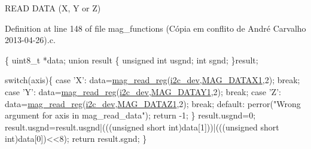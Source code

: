 R\-E\-A\-D D\-A\-T\-A (X, Y or Z) 



Definition at line 148 of file mag\-\_\-functions (\-Cópia em conflito de André Carvalho 2013-\/04-\/26).\-c.


\begin{DoxyCode}
\{
  uint8\_t *data;
  \textcolor{keyword}{union }result
  \{
    \textcolor{keywordtype}{unsigned} \textcolor{keywordtype}{int} usgnd;
    \textcolor{keywordtype}{int} sgnd;
  \}result;

  \textcolor{keywordflow}{switch}(axis)\{
    \textcolor{keywordflow}{case} \textcolor{charliteral}{'X'}:
      data=\hyperlink{imu__functions_01_07C_xC3_xB3pia_01em_01conflito_01de_01Andr_xC3_xA9_01Carvalho_012013-04-26_08_8h_a6830eaeae2298320e1e8c902e4edd709}{mag\_read\_reg}(\hyperlink{CommunicationV0_2communication_8c_a7751bd45ac1064efb35adf1f19c25db8}{i2c\_dev},\hyperlink{communication_2imu__regs_8h_a4f883328e7ae117996e334145ddd0032}{MAG\_DATAX1},2);
      \textcolor{keywordflow}{break};
    \textcolor{keywordflow}{case} \textcolor{charliteral}{'Y'}:
      data=\hyperlink{imu__functions_01_07C_xC3_xB3pia_01em_01conflito_01de_01Andr_xC3_xA9_01Carvalho_012013-04-26_08_8h_a6830eaeae2298320e1e8c902e4edd709}{mag\_read\_reg}(\hyperlink{CommunicationV0_2communication_8c_a7751bd45ac1064efb35adf1f19c25db8}{i2c\_dev},\hyperlink{communication_2imu__regs_8h_ae218906702b1e40c2b6970f97dd0cfe4}{MAG\_DATAY1},2);
      \textcolor{keywordflow}{break};
    \textcolor{keywordflow}{case} \textcolor{charliteral}{'Z'}:
      data=\hyperlink{imu__functions_01_07C_xC3_xB3pia_01em_01conflito_01de_01Andr_xC3_xA9_01Carvalho_012013-04-26_08_8h_a6830eaeae2298320e1e8c902e4edd709}{mag\_read\_reg}(\hyperlink{CommunicationV0_2communication_8c_a7751bd45ac1064efb35adf1f19c25db8}{i2c\_dev},\hyperlink{communication_2imu__regs_8h_a81d7d9236ec69a1a229e4fa7c6299fde}{MAG\_DATAZ1},2);
      \textcolor{keywordflow}{break};
    \textcolor{keywordflow}{default}:
      perror(\textcolor{stringliteral}{"Wrong argument for axis in mag\_read\_data"});
      \textcolor{keywordflow}{return} -1;
  \}
  result.usgnd=0;
  result.usgnd=result.usgnd|(((\textcolor{keywordtype}{unsigned} \textcolor{keywordtype}{short} int)data[1]))|(((\textcolor{keywordtype}{unsigned} \textcolor{keywordtype}{short} \textcolor{keywordtype}{
      int})data[0])<<8);
  \textcolor{keywordflow}{return} result.sgnd;
\}\end{DoxyCode}
